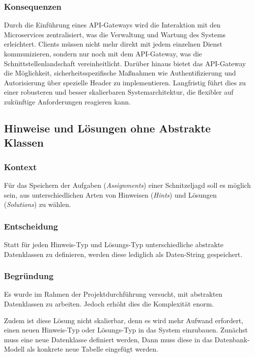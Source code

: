 \subsubsection{Konsequenzen}

Durch die Einführung eines API-Gateways wird die Interaktion mit den Microservices zentralisiert, was die Verwaltung und Wartung des Systems erleichtert. Clients müssen nicht mehr direkt mit jedem einzelnen Dienst kommunizieren, sondern nur noch mit dem API-Gateway, was die Schnittstellenlandschaft vereinheitlicht. Darüber hinaus bietet das API-Gateway die Möglichkeit, sicherheitsspezifische Maßnahmen wie Authentifizierung und Autorisierung über spezielle Header zu implementieren. Langfristig führt dies zu einer robusteren und besser skalierbaren Systemarchitektur, die flexibler auf zukünftige Anforderungen reagieren kann.

\subsection{Hinweise und Lösungen ohne Abstrakte Klassen} \label{appendix:adr:er}

\subsubsection{Kontext}

Für das Speichern der Aufgaben (\textit{Assignments}) einer Schnitzeljagd soll es möglich sein, aus unterschiedlichen Arten von Hinweisen (\textit{Hints}) und Lösungen (\textit{Solutions}) zu wählen.

\subsubsection{Entscheidung}

Statt für jeden Hinweis-Typ und Lösungs-Typ unterschiedliche abstrakte Datenklassen zu definieren, werden diese lediglich als Daten-String gespeichert.

\subsubsection{Begründung}

Es wurde im Rahmen der Projektdurchführung versucht, mit abstrakten Datenklassen zu arbeiten. Jedoch erhöht dies die Komplexität enorm.

Zudem ist diese Lösung nicht skalierbar, denn es wird mehr Aufwand erfordert, einen neuen Hinweis-Typ oder Lösungs-Typ in das System einzubauen. Zunächst muss eine neue Datenklasse definiert werden, Dann muss diese in das Datenbank-Modell als konkrete neue Tabelle eingefügt werden.

